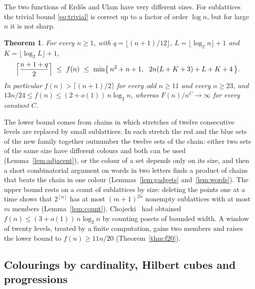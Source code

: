 \documentclass[11pt,reqno]{amsart}
\numberwithin{equation}{section}
\theoremstyle{plain}
\newtheorem{theorem}{Theorem}[section]
\theoremstyle{definition}
\theoremstyle{remark}
\begin{document}
The two functions of Erd\H{o}s and Ulam have very different sizes. For
sublattices the trivial bound \eqref{eq:trivial} is correct up to a factor
of order $\log n$, but for large $n$ it is not sharp.

\begin{theorem}
\label{thm:f}
For every $n\ge1$, with $q=\lfloor(n+1)/12\rfloor$,
$L=\lfloor\log_2n\rfloor+1$ and $K=\lfloor\log_2L\rfloor+1$,
\[
\Bigl\lceil\frac{n+1+q}{2}\Bigr\rceil\ \le\ f(n)\ \le\
\min\bigl\{\,n^{2}+n+1,\ \ 2n(L+K+3)+L+K+4\,\bigr\}.
\]
In particular $f(n)>\lceil(n+1)/2\rceil$ for every odd $n\ge11$ and every
$n\ge23$, and $13n/24\le f(n)\le(2+o(1))\,n\log_2n$, whereas
$F(n)/n^{C}\to\infty$ for every constant $C$.
\end{theorem}

The lower bound comes from chains in which stretches of twelve
consecutive levels are replaced by small sublattices. In each stretch
the red and the blue sets of the new family together outnumber the twelve
sets of the chain: either two sets of the same size have different
colours and both can be used (Lemma~\ref{lem:adjacent}), or the colour of
a set depends only on its size, and then a short combinatorial argument on
words in two letters finds a product of chains that beats the chain in
one colour (Lemmas~\ref{lem:gadgets} and~\ref{lem:words}). The upper bound
rests on a count of sublattices by size: deleting the points one at a
time shows that $2^{[n]}$ has at most $(m+1)^{2n}$ nonempty sublattices
with at most $m$ members (Lemma~\ref{lem:count}). Chojecki~\cite{Ch26}
had obtained $f(n)\le(3+o(1))\,n\log_2n$ by counting posets of bounded
width. A window of twenty levels, treated by a finite computation, gains
two members and raises the lower bound to $f(n)\ge11n/20$
(Theorem~\ref{thm:f20}).

\subsection{Colourings by cardinality, Hilbert cubes and progressions}
\end{document}
